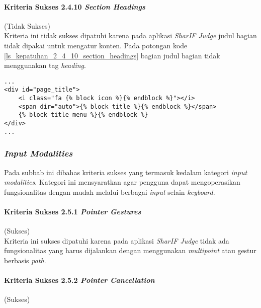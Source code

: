 \paragraph{Kriteria Sukses 2.4.10 \textit{Section Headings}}
\label{subsubsec:kepatuhan_kriteria_2.4.10}
(Tidak Sukses) \\

Kriteria ini tidak sukses dipatuhi karena pada aplikasi \textit{SharIF Judge} judul bagian tidak dipakai untuk mengatur konten. Pada potongan kode \ref{ls_kepatuhan_2_4_10_section_headings} bagian judul bagian tidak menggunakan tag \textit{heading}.
\begin{lstlisting}[basicstyle=\ttfamily, frame=single,
columns=fullflexible, keepspaces=true, breaklines=true, label=ls_kepatuhan_2_4_10_section_headings, caption=Pelanggaran Kriteria Sukses 2.4.10 - \textit{Title Heading} Tidak Dipakai]
...
<div id="page_title">
	<i class="fa {% block icon %}{% endblock %}"></i>
	<span dir="auto">{% block title %}{% endblock %}</span>
	{% block title_menu %}{% endblock %}
</div>
...
\end{lstlisting}

\subsubsection{\textit{Input Modalities}}
\label{subsubsec:input_modalities}

Pada subbab ini dibahas kriteria sukses yang termasuk kedalam kategori \textit{input modalities}. Kategori ini mensyaratkan agar pengguna dapat mengoperasikan fungsionalitas dengan mudah melalui berbagai \textit{input} selain \textit{keyboard}.

\paragraph{Kriteria Sukses 2.5.1 \textit{Pointer Gestures}}
\label{subsubsec:kepatuhan_kriteria_2.5.1}
(Sukses) \\

Kriteria ini sukses dipatuhi karena pada aplikasi \textit{SharIF Judge} tidak ada fungsionalitas yang harus dijalankan dengan menggunakan \textit{multipoint} atau gestur berbasis \textit{path}.

\paragraph{Kriteria Sukses 2.5.2 \textit{Pointer Cancellation}}
\label{subsubsec:kepatuhan_kriteria_2.5.2}
(Sukses) \\

